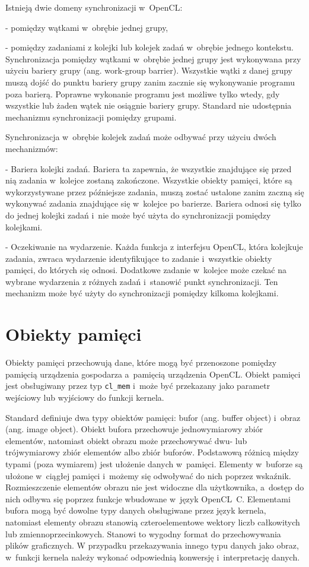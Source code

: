 Istnieją dwie domeny synchronizacji w~OpenCL:

- pomiędzy wątkami w~obrębie jednej grupy,

- pomiędzy zadaniami z kolejki lub kolejek zadań w~obrębie jednego kontekstu.\\

Synchronizacja pomiędzy wątkami w~obrębie jednej grupy jest wykonywana przy użyciu bariery grupy (ang. work-group barrier). Wszystkie wątki z danej grupy muszą dojść do punktu bariery grupy zanim zacznie się wykonywanie programu poza barierą. Poprawne wykonanie programu jest możliwe tylko wtedy, gdy wszystkie lub żaden wątek nie osiągnie bariery grupy. Standard nie udostępnia mechanizmu synchronizacji pomiędzy grupami.

Synchronizacja w~obrębie kolejek zadań może odbywać przy użyciu dwóch mechanizmów:

- Bariera kolejki zadań. Bariera ta zapewnia, że wszystkie znajdujące się przed nią zadania w~kolejce zostaną zakończone. Wszystkie obiekty pamięci, które są wykorzystywane przez późniejsze zadania, muszą zostać ustalone zanim zaczną się wykonywać zadania znajdujące się w~kolejce po barierze. Bariera odnosi się tylko do jednej kolejki zadań i~nie może być użyta do synchronizacji pomiędzy kolejkami. 

- Oczekiwanie na wydarzenie. Każda funkcja z interfejsu OpenCL, która kolejkuje zadania, zwraca wydarzenie identyfikujące to zadanie i~wszystkie obiekty pamięci, do których się odnosi. Dodatkowe zadanie w~kolejce może czekać na wybrane wydarzenia z różnych zadań i~stanowić punkt synchronizacji. Ten mechanizm może być użyty do synchronizacji pomiędzy kilkoma kolejkami.

\section{Obiekty pamięci}\label{sec:OpenC61asdL}

Obiekty pamięci przechowują dane, które mogą być przenoszone pomiędzy pamięcią urządzenia gospodarza a~pamięcią urządzenia OpenCL. Obiekt pamięci jest obsługiwany przez typ \verb|cl_mem| i~może być przekazany jako parametr wejściowy lub wyjściowy do funkcji kernela.

Standard definiuje dwa typy obiektów pamięci: bufor (ang. buffer object) i~obraz (ang. image object). Obiekt bufora przechowuje jednowymiarowy zbiór elementów, natomiast obiekt obrazu może przechowywać dwu- lub trójwymiarowy zbiór elementów albo zbiór buforów. Podstawową różnicą między typami (poza wymiarem) jest ułożenie danych w~pamięci. Elementy w~buforze są ułożone w~ciągłej pamięci i~możemy się odwoływać do nich poprzez wskaźnik. Rozmieszczenie elementów obrazu nie jest widoczne dla użytkownika, a~dostęp do nich odbywa się poprzez funkcje wbudowane w~język OpenCL~C. Elementami bufora mogą być dowolne typy danych obsługiwane przez język kernela, natomiast elementy obrazu stanowią czteroelementowe wektory liczb całkowitych lub zmiennoprzecinkowych. Stanowi to wygodny format do przechowywania plików graficznych. W przypadku przekazywania innego typu danych jako obraz, w~funkcji kernela należy wykonać odpowiednią konwersję i~interpretację danych.

